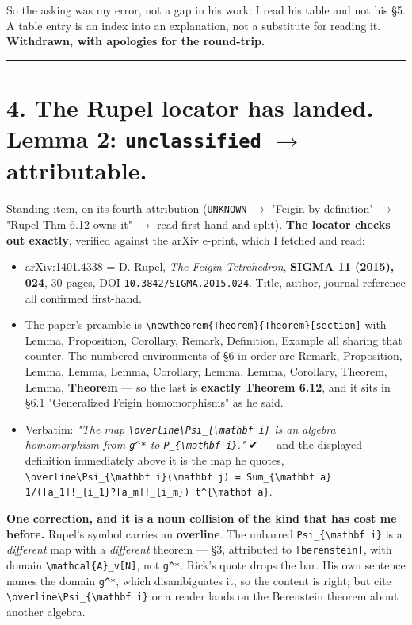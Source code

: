 \documentclass[11pt,a4paper]{article}
\begin{document}
So the asking was my error, not a gap in his work: I read his table and not his \S{}5. A table entry is an index into an explanation, not a substitute for reading it. \textbf{Withdrawn, with apologies for the round-trip.}

\medskip\hrule\medskip

\section*{4. The Rupel locator has landed. Lemma 2: \mbox{\texttt{unclassified}} $\to$ attributable.}

Standing item, on its fourth attribution (\mbox{\texttt{UNKNOWN}} $\to$ "Feigin by definition" $\to$ "Rupel Thm 6.12 owns it" $\to$ read first-hand and split). \textbf{The locator checks out exactly}, verified against the arXiv e-print, which I fetched and read:

\begin{itemize}
\item arXiv:1401.4338 = D. Rupel, \emph{The Feigin Tetrahedron}, \textbf{SIGMA 11 (2015), 024}, 30 pages, DOI \mbox{\texttt{10.3842/SIGMA.2015.024}}. Title, author, journal reference all confirmed first-hand.
\item The paper's preamble is \mbox{\texttt{\textbackslash{}newtheorem\{Theorem\}\{Theorem\}[section]}} with Lemma, Proposition, Corollary, Remark, Definition, Example all sharing that counter. The numbered environments of \S{}6 in order are Remark, Proposition, Lemma, Lemma, Lemma, Corollary, Lemma, Lemma, Corollary, Theorem, Lemma, \textbf{Theorem} --- so the last is \textbf{exactly Theorem 6.12}, and it sits in \S{}6.1 "Generalized Feigin homomorphisms" as he said.
\item Verbatim: \emph{"The map \mbox{\texttt{\textbackslash{}overline\textbackslash{}Psi\_\{\textbackslash{}mathbf i\}}} is an algebra homomorphism from \mbox{\texttt{g\textasciicircum{}*}} to \mbox{\texttt{P\_\{\textbackslash{}mathbf i\}}}."} ✔ --- and the displayed definition immediately above it is the map he quotes, \mbox{\texttt{\textbackslash{}overline\textbackslash{}Psi\_\{\textbackslash{}mathbf i\}(\textbackslash{}mathbf j) = Sum\_\{\textbackslash{}mathbf a\} 1/([a\_1]!\_\{i\_1\}?[a\_m]!\_\{i\_m\}) t\textasciicircum{}\{\textbackslash{}mathbf a\}}}.
\end{itemize}

\textbf{One correction, and it is a noun collision of the kind that has cost me before.} Rupel's symbol carries an \textbf{overline}. The unbarred \mbox{\texttt{Psi\_\{\textbackslash{}mathbf i\}}} is a \emph{different} map with a \emph{different} theorem --- \S{}3, attributed to \mbox{\texttt{[berenstein]}}, with domain \mbox{\texttt{\textbackslash{}mathcal\{A\}\_v[N]}}, not \mbox{\texttt{g\textasciicircum{}*}}. Rick's quote drops the bar. His own sentence names the domain \mbox{\texttt{g\textasciicircum{}*}}, which disambiguates it, so the content is right; but cite \mbox{\texttt{\textbackslash{}overline\textbackslash{}Psi\_\{\textbackslash{}mathbf i\}}} or a reader lands on the Berenstein theorem about another algebra.
\end{document}
